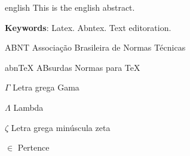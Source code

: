 \documentclass[
12pt,				%
openright,			%
twoside,			%
a4paper,			%
chapter=TITLE,		%
english,			%
brazil				%
]{abntex2}
\begin{document}
\begin{resumo}[Abstract]
 \begin{otherlanguage*}{english}
   This is the english abstract.
   \noindent
   
   \textbf{Keywords}: Latex. Abntex. Text editoration.
 \end{otherlanguage*}
\end{resumo}


\listoffigures*
\cleardoublepage

\listofquadros*
\cleardoublepage

\lstlistoflistings*
\cleardoublepage


\listoftables*
\cleardoublepage


\begin{siglas}
  \item[ABNT] Associação Brasileira de Normas Técnicas
  \item[abnTeX] ABsurdas Normas para TeX
\end{siglas}

\begin{simbolos}
  \item[$ \Gamma $] Letra grega Gama
  \item[$ \Lambda $] Lambda
  \item[$ \zeta $] Letra grega minúscula zeta
  \item[$ \in $] Pertence
\end{simbolos}

\tableofcontents*
\cleardoublepage



\textual
\pagestyle{simple}
\end{document}
